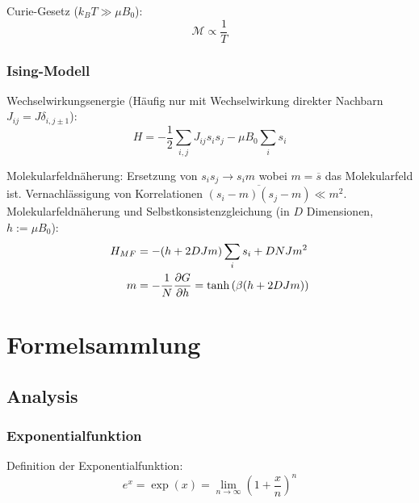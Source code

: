 \documentclass[11pt]{article}
\numberwithin{equation}{section}
\begin{document}
        Curie-Gesetz ($k_B T \gg \mu B_0$):
        \begin{equation}
          \mathcal{M} \propto \frac{1}{T}
        \end{equation}

      \subsubsection{Ising-Modell}
        Wechselwirkungsenergie (Häufig nur mit Wechselwirkung direkter Nachbarn $J_{ij} = J \delta_{i,j\pm 1}$):
        \begin{equation}
          H = -\frac{1}{2}\sum_{i,j} J_{ij} s_i s_j -\mu B_0 \sum_i s_i
        \end{equation}

        Molekularfeldnäherung: \newline Ersetzung von $s_i s_j \rightarrow s_i m$ wobei $m = \overline{s}$ das Molekularfeld ist. Vernachlässigung von Korrelationen $\overline{(s_i-m)(s_j-m)}\ll m^2$. \nl
        Molekularfeldnäherung und Selbstkonsistenzgleichung (in $D$ Dimensionen, $h:=\mu B_0$):
        \begin{equation}
          \begin{aligned}
            H_{MF} &= -(h + 2 D J m) \sum_i s_i + D N J m^2 \\
            m &= -\frac{1}{N}\frac{\partial G}{\partial h} = \tanh\left({\beta(h + 2 D J m)}\right)
          \end{aligned}
        \end{equation}



  \newpage
	\section{Formelsammlung}
    \subsection{Analysis}
  	  \subsubsection{Exponentialfunktion}

  			Definition der Exponentialfunktion:
  			\begin{equation}
  				e^x=\exp{(x)}=\lim_{n\rightarrow \infty}\left(1+\frac{x}{n}\right)^n
  			\end{equation}
\end{document}
